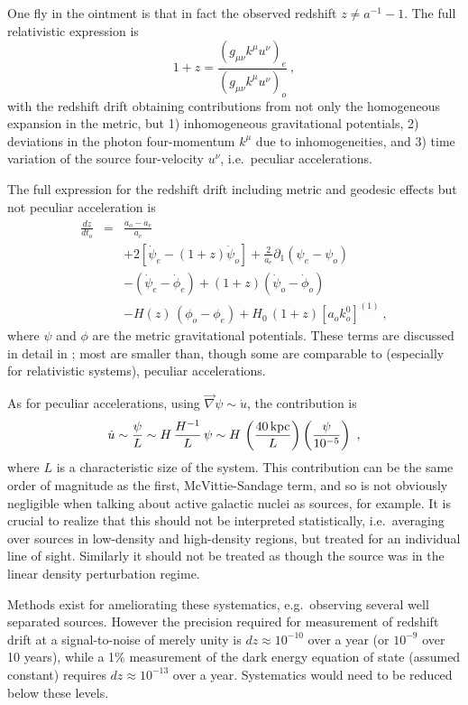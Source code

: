 \documentclass[preprint2, 10pt]{aastex}
\newcommand{\be}{\begin{equation}}
\newcommand{\ee}{\end{equation}}
\newcommand{\bea}{\begin{eqnarray}}
\newcommand{\eea}{\end{eqnarray}}
\begin{document}
One fly in the ointment is that in fact the observed redshift 
$z\ne a^{-1}-1$. The full relativistic expression is 
\be 
1+z=\frac{(g_{\mu\nu}k^\mu u^\nu)_e}{(g_{\mu\nu}k^\mu u^\nu)_o}\ , 
\label{eq:zgen} 
\ee 
with the redshift drift obtaining contributions from not only the 
homogeneous expansion in the metric, but 1) inhomogeneous gravitational 
potentials, 2) deviations in the photon four-momentum $k^\mu$ due to 
inhomogeneities, and 3) time variation of the source four-velocity $u^\nu$, 
i.e.\ peculiar accelerations.  

The full expression for the redshift drift including metric and geodesic 
effects but not peculiar acceleration is 
\bea 
\frac{dz}{dt_o}&=&\frac{\dot a_o-\dot a_e}{a_e}\\ 
&&+2[\dot\psi_e-(1+z)\dot\psi_o]
+\frac{2}{a_e}\partial_1(\psi_e-\psi_o)\nonumber\\ 
&&-(\dot\psi_e-\dot\phi_e)+(1+z)(\dot\psi_o-\dot\phi_o)\nonumber\\ 
&&-H(z)\,(\phi_o-\phi_e)+H_0\,(1+z)[a_o k^0_o]^{(1)}\ ,\nonumber  
\eea 
where $\psi$ and $\phi$ are the metric gravitational potentials. 
These terms are discussed in detail in \citet{10044646}; most are smaller 
than, though some are comparable to (especially for relativistic systems), 
peculiar accelerations. 

As for peculiar accelerations, using 
$\vec\nabla\psi\sim \dot u$, the contribution is 
\be 
\dot u \sim \frac{\psi}{L}\sim H\,\frac{H^{-1}}{L}\,\psi\sim H\, 
\left(\frac{40\,{\rm kpc}}{L}\right)\left(\frac{\psi}{10^{-5}}\right)\ , 
\ee 
where $L$ is a characteristic size of the system.  This contribution can be 
the same order of magnitude as the first, McVittie-Sandage term, and so is 
not obviously negligible when talking about active galactic nuclei as 
sources, for example. It is crucial to realize that this should not be 
interpreted statistically, i.e.\ averaging over sources in low-density 
and high-density regions, but treated for an individual line of sight. 
Similarly it should not be treated as though the source was in the linear 
density perturbation regime. 

Methods exist for ameliorating these systematics, e.g.\ observing several 
well separated sources.  However the precision required for measurement of 
redshift drift at a signal-to-noise of merely unity is 
$dz\approx 10^{-10}$ over a year (or $10^{-9}$ over 10 years), 
while a 1\% measurement of the dark energy equation of state (assumed 
constant) requires $dz\approx 10^{-13}$ over a year.  Systematics would 
need to be reduced below these levels. 
\end{document}
